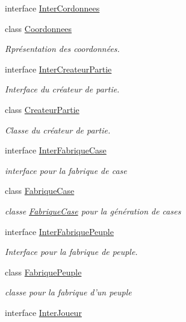 \begin{DoxyCompactItemize}
interface \hyperlink{interface_small_world_1_1_inter_cordonnees}{Inter\-Cordonnees}
\item 
class \hyperlink{class_small_world_1_1_coordonnees}{Coordonnees}
\begin{DoxyCompactList}\small\item\em Rprésentation des coordonnées. \end{DoxyCompactList}\item 
interface \hyperlink{interface_small_world_1_1_inter_createur_partie}{Inter\-Createur\-Partie}
\begin{DoxyCompactList}\small\item\em Interface du créateur de partie. \end{DoxyCompactList}\item 
class \hyperlink{class_small_world_1_1_createur_partie}{Createur\-Partie}
\begin{DoxyCompactList}\small\item\em Classe du créateur de partie. \end{DoxyCompactList}\item 
interface \hyperlink{interface_small_world_1_1_inter_fabrique_case}{Inter\-Fabrique\-Case}
\begin{DoxyCompactList}\small\item\em interface pour la fabrique de case \end{DoxyCompactList}\item 
class \hyperlink{class_small_world_1_1_fabrique_case}{Fabrique\-Case}
\begin{DoxyCompactList}\small\item\em classe \hyperlink{class_small_world_1_1_fabrique_case}{Fabrique\-Case} pour la génération de cases \end{DoxyCompactList}\item 
interface \hyperlink{interface_small_world_1_1_inter_fabrique_peuple}{Inter\-Fabrique\-Peuple}
\begin{DoxyCompactList}\small\item\em Interface pour la fabrique de peuple. \end{DoxyCompactList}\item 
class \hyperlink{class_small_world_1_1_fabrique_peuple}{Fabrique\-Peuple}
\begin{DoxyCompactList}\small\item\em classe pour la fabrique d'un peuple \end{DoxyCompactList}\item 
interface \hyperlink{interface_small_world_1_1_inter_joueur}{Inter\-Joueur}

\end{DoxyCompactItemize}
